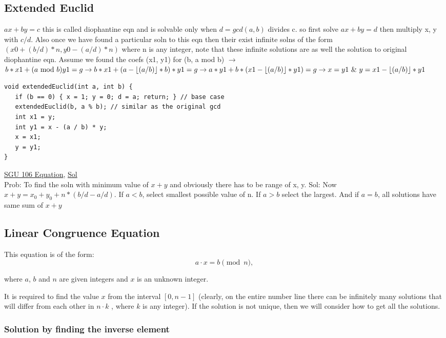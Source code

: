 \documentclass[8pt, a4paper, oneside, twocolumn]{extarticle}
\begin{document}
\subsection{Extended Euclid}
$ax + by = c$ this is called diophantine eqn and is solvable only when $d = gcd(a, b)$ divides c. so first solve $ax + by = d$ then multiply x, y with $c / d$. Also once we have found a particular soln to this eqn then their exist infinite solns of the form $(x0 + (b/d)*n, y0 - (a/d)*n)$ where n is any integer, note that these infinite solutions are as well the solution to original diophantine eqn. Assume we found the coefs (x1, y1) for (b, a mod b) $\rightarrow$ $b*x1 + (a\text{ mod }b)y1 = g\\ \rightarrow b*x1 + (a - \lfloor(a/b)\rfloor*b)*y1=g\\
\rightarrow a*y1 + b*(x1 - \lfloor (a/b)\rfloor * y1) = g\\
\rightarrow x = y1\text{ \& }y = x1 - \lfloor (a/b)\rfloor*y1$
\begin{verbatim}
void extendedEuclid(int a, int b) {
   if (b == 0) { x = 1; y = 0; d = a; return; } // base case
   extendedEuclid(b, a % b); // similar as the original gcd
   int x1 = y;
   int y1 = x - (a / b) * y;
   x = x1;
   y = y1;
}
\end{verbatim}
\href{https://codeforces.com/problemsets/acmsguru/problem/99999/106}{SGU 106 Equation}, \href{https://github.com/sourabhxyz/Competitive-Programming/blob/master/IMP%20QUES/Extended%20Euclid/106-The%20Equation.cpp}{Sol}
\\Prob: To find the soln with minimum value of $x + y$ and obviously there has to be range of x, y. Sol: Now $x + y = x_0 + y_0 + n * (b/d - a/d)$. If $a < b$, select smallest possible value of n. If $a > b$ select the largest. And if $a = b$, all solutions have same sum of $x + y$
\subsection{Linear Congruence Equation}
This equation is of the form:
$$a \cdot x = b \pmod n,$$

where $a$, $b$ and $n$ are given integers and $x$ is an unknown integer.

It is required to find the value $x$ from the interval $[0, n-1]$ (clearly, on the entire number line there can be infinitely many solutions that will differ from each other in $n \cdot k$ , where $k$ is any integer). If the solution is not unique, then we will consider how to get all the solutions.
\subsubsection{Solution by finding the inverse element}
\end{document}
